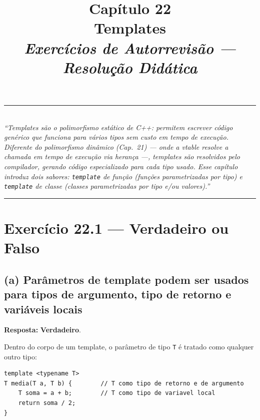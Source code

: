 \documentclass[11pt,a4paper]{article}
\title{
  \vspace{-1cm}
  {\Huge\bfseries\color{deitelblue} Cap\'itulo 22}\\[0.3em]
  {\Large\bfseries Templates}\\[0.8em]
  {\large\itshape Exerc\'icios de Autorrevis\~ao --- Resolu\c{c}\~ao Did\'atica}
}
\author{}
\date{}
\begin{document}
\maketitle
\thispagestyle{empty}
\vspace{-2em}

\begin{center}
\rule{0.85\textwidth}{0.5pt}\\[0.4em]
\textit{``Templates s\~ao o \emph{polimorfismo est\'atico} de C++: permitem escrever c\'odigo gen\'erico que funciona para v\'arios tipos sem custo em tempo de execu\c{c}\~ao. Diferente do polimorfismo din\^amico (Cap.~21) --- onde a vtable resolve a chamada em tempo de execu\c{c}\~ao via heran\c{c}a ---, templates s\~ao resolvidos pelo \emph{compilador}, gerando c\'odigo especializado para cada tipo usado. Esse cap\'itulo introduz dois sabores: \texttt{template} de fun\c{c}\~ao (fun\c{c}\~oes parametrizadas por tipo) e \texttt{template} de classe (classes parametrizadas por tipo e/ou valores).''}\\[0.4em]
\rule{0.85\textwidth}{0.5pt}
\end{center}

\vspace{1em}

\section{Exerc\'icio 22.1 --- Verdadeiro ou Falso}

\subsection*{(a) Par\^ametros de template podem ser usados para tipos de argumento, tipo de retorno e vari\'aveis locais}

\begin{resposta}\textbf{Resposta:} \textbf{Verdadeiro}.\end{resposta}

Dentro do corpo de um template, o par\^ametro de tipo \texttt{T} \'e tratado como qualquer outro tipo:

\begin{lstlisting}[style=cppcode,numbers=none]
template <typename T>
T media(T a, T b) {        // T como tipo de retorno e de argumento
    T soma = a + b;        // T como tipo de variavel local
    return soma / 2;
}
\end{lstlisting}
\end{document}
